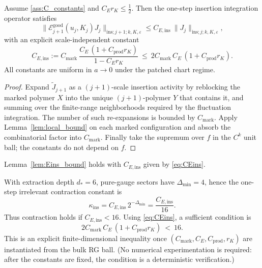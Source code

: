 \begin{proposition}\label{prop:Eins_bound}
Assume \ref{ass:C_constants} and $C_E r_K\le \tfrac12$.
Then the one-step insertion integration operator satisfies
\[
\|\mathcal E^{\mathrm{good}}_{j+1}(u_j,K_j)J_j\|_{\mathrm{ins};j+1;k,K,\varepsilon}
\le C_{E,\mathrm{ins}}\ \|J_j\|_{\mathrm{ins};j;k,K,\varepsilon},
\]
with an explicit scale-independent constant
\begin{equation}\label{eq:CEins}
C_{E,\mathrm{ins}}
:= C_{\mathrm{mark}}\ \frac{C_E\,(1+C_{\mathrm{prod}}r_K)}{1-C_E r_K}
\ \le\ 2C_{\mathrm{mark}}\,C_E\,(1+C_{\mathrm{prod}}r_K).
\end{equation}
All constants are uniform in $a\to0$ under the patched chart regime.
\end{proposition}

\begin{proof}
Expand $\widetilde J_{j+1}$ as a $(j+1)$-scale insertion activity by reblocking the marked polymer $X$ into the unique $(j+1)$-polymer $Y$ that contains it,
and summing over the finite-range neighborhoods required by the fluctuation integration. The number of such re-expansions is bounded by $C_{\mathrm{mark}}$.
Apply Lemma~\ref{lem:local_bound} on each marked configuration and absorb the combinatorial factor into $C_{\mathrm{mark}}$.
Finally take the supremum over $f$ in the $C^k$ unit ball; the constants do not depend on $f$.
\end{proof}

\begin{corollary}\label{cor:lemEins}
Lemma~\ref{lem:Eins_bound} holds with $C_{E,\mathrm{ins}}$ given by \eqref{eq:CEins}.
\end{corollary}

With extraction depth $d_\ast=6$, pure-gauge sectors have $\Delta_{\min}=4$, hence the one-step irrelevant contraction constant is
\[
\kappa_{\mathrm{ins}}=C_{E,\mathrm{ins}}\,2^{-\Delta_{\min}}=\frac{C_{E,\mathrm{ins}}}{16}.
\]
Thus contraction holds if $C_{E,\mathrm{ins}}<16$.
Using \eqref{eq:CEins}, a sufficient condition is
\[
2C_{\mathrm{mark}}\,C_E\,(1+C_{\mathrm{prod}}r_K)\ <\ 16.
\]
This is an explicit finite-dimensional inequality once $(C_{\mathrm{mark}},C_E,C_{\mathrm{prod}},r_K)$ are instantiated from the bulk RG ball.
(No numerical experimentation is required: after the constants are fixed, the condition is a deterministic verification.)

